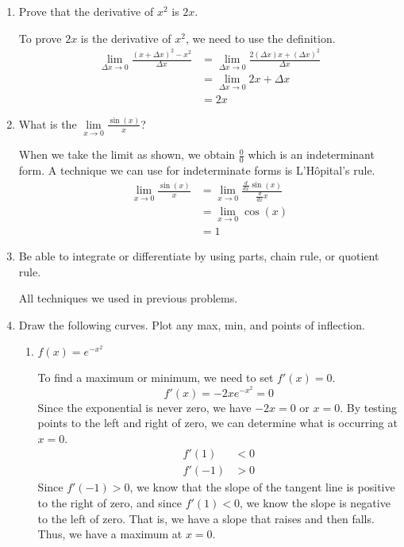 \begin{enumerate}
\item
  Prove that the derivative of \(x^2\) is \(2x\).
  \par\smallskip
  To prove \(2x\) is the derivative of \(x^2\), we need to use the definition.
  \begin{align*}
    \lim_{\Delta x\to 0}\frac{(x + \Delta x)^2 - x^2}{\Delta x}
    &= \lim_{\Delta x\to 0}\frac{2(\Delta x)x + (\Delta x)^2}{\Delta x}\\
    &= \lim_{\Delta x\to 0}2x + \Delta x\\
    & = 2x
  \end{align*}
\item
  What is the \(\lim\limits_{x\to 0}\frac{\sin(x)}{x}\)?
  \par\smallskip
  When we take the limit as shown, we obtain \(\frac{0}{0}\) which is an
  indeterminant form.
  A technique we can use for indeterminate forms is L'H{\^o}pital's rule.
  \begin{align*}
    \lim_{x\to 0}\frac{\sin(x)}{x}
    &= \lim_{x\to 0}\frac{\frac{d}{dx}\sin(x)}{\frac{d}{dx}x}\\
    &= \lim_{x\to 0}\cos(x)\\
    &= 1
  \end{align*}
\item
  Be able to integrate or differentiate by using parts, chain rule, or quotient
  rule.
  \par\smallskip
  All techniques we used in previous problems.
\item
  Draw the following curves.
  Plot any max, min, and points of inflection.
  \begin{enumerate}[label = (\alph*)]
  \item
    \(f(x) = e^{-x^2}\)
    \par\smallskip
    To find a maximum or minimum, we need to set \(f'(x) = 0\).
    \[
    f'(x) = -2xe^{-x^2} = 0
    \]
    Since the exponential is never zero, we have \(-2x = 0\) or \(x = 0\).
    By testing points to the left and right of zero, we can determine what is
    occurring at \(x = 0\).
    \begin{align*}
      f'(1) &< 0\\
      f'(-1) &> 0
    \end{align*}
    Since \(f'(-1) > 0\), we know that the slope of the tangent line is positive
    to the right of zero, and since \(f'(1) < 0\), we know the slope is negative
    to the left of zero.
    That is, we have a slope that raises and then falls.
    Thus, we have a maximum at \(x = 0\).

\end{enumerate}
\end{enumerate}
